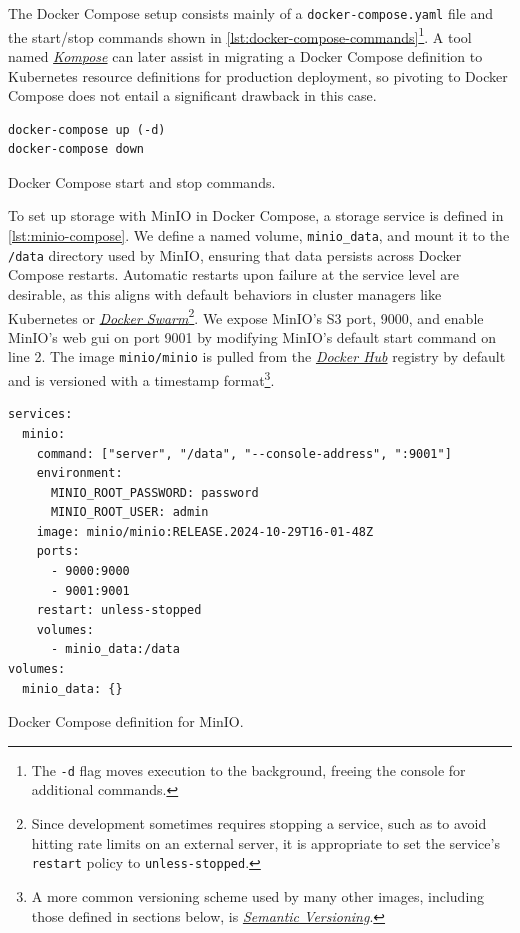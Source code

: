 The Docker Compose setup consists mainly of a \texttt{docker-compose.yaml} file and the start/stop commands shown in \cref{lst:docker-compose-commands}\footnote{The \texttt{-d} flag moves execution to the background, freeing the console for additional commands.}.
A tool named \href{https://kompose.io/}{\textit{Kompose}} can later assist in migrating a Docker Compose definition to Kubernetes resource definitions for production deployment, so pivoting to Docker Compose does not entail a significant drawback in this case.

\begin{listing}[H]
\begin{verbatim}
docker-compose up (-d)
docker-compose down
\end{verbatim}
\caption{Docker Compose start and stop commands.}
\label{lst:docker-compose-commands}
\end{listing}

To set up storage with MinIO in Docker Compose, a storage service is defined in \cref{lst:minio-compose}.
We define a named volume, \texttt{minio\_data}, and mount it to the \texttt{/data} directory used by MinIO, ensuring that data persists across Docker Compose restarts.
Automatic restarts upon failure at the service level are desirable, as this aligns with default behaviors in cluster managers like Kubernetes or \href{https://docs.docker.com/engine/swarm/}{\textit{Docker Swarm}}\footnote{Since development sometimes requires stopping a service, such as to avoid hitting rate limits on an external server, it is appropriate to set the service's \texttt{restart} policy to \texttt{unless-stopped}.}.
We expose MinIO's S3 port, 9000, and enable MinIO's web \ac{gui} on port 9001 by modifying MinIO's default start command on line 2.
The image \texttt{minio/minio} is pulled from the \href{https://hub.docker.com/}{\textit{Docker Hub}} registry by default and is versioned with a timestamp format\footnote{A more common versioning scheme used by many other images, including those defined in sections below, is \href{https://semver.org/}{\textit{Semantic Versioning}}.}.

\begin{listing}[H]
\begin{verbatim}
services:
  minio:
    command: ["server", "/data", "--console-address", ":9001"]
    environment:
      MINIO_ROOT_PASSWORD: password
      MINIO_ROOT_USER: admin
    image: minio/minio:RELEASE.2024-10-29T16-01-48Z
    ports:
      - 9000:9000
      - 9001:9001
    restart: unless-stopped
    volumes:
      - minio_data:/data
volumes:
  minio_data: {}
\end{verbatim}
\caption{Docker Compose definition for MinIO.}
\label{lst:minio-compose}
\end{listing}

